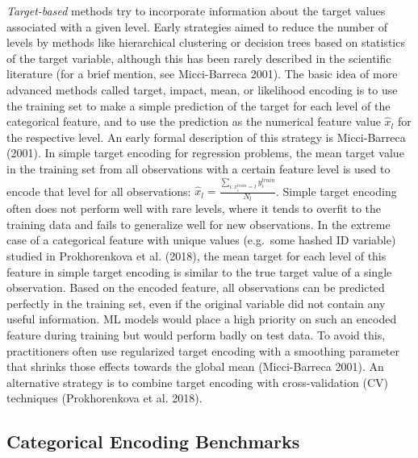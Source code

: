 \documentclass[smallextended]{svjour3}       %
\begin{document}
\emph{Target-based} methods try to incorporate information about the target values associated with a given level.
Early strategies aimed to reduce the number of levels by methods like hierarchical clustering or decision trees based on statistics of the target variable, although this has been rarely described in the scientific literature (for a brief mention, see Micci-Barreca 2001).
The basic idea of more advanced methods called target, impact, mean, or likelihood encoding is to use the training set to make a simple prediction of the target for each level of the categorical feature, and to use the prediction as the numerical feature value \(\hat{x}_l\) for the respective level.
An early formal description of this strategy is Micci-Barreca (2001).
In simple target encoding for regression problems, the mean target value in the training set from all observations with a certain feature level is used to encode that level for all observations: \(\hat{x}_l = \frac{\sum_{i:x^{train}_i = l}y^{train}_i}{N_l}\).
Simple target encoding often does not perform well with rare levels, where it tends to overfit to the training data and fails to generalize well for new observations.
In the extreme case of a categorical feature with unique values (e.g.~some hashed ID variable) studied in Prokhorenkova et al. (2018), the mean target for each level of this feature in simple target encoding is similar to the true target value of a single observation.
Based on the encoded feature, all observations can be predicted perfectly in the training set, even if the original variable did not contain any useful information.
ML models would place a high priority on such an encoded feature during training but would perform badly on test data.
To avoid this, practitioners often use regularized target encoding with a smoothing parameter that shrinks those effects towards the global mean (Micci-Barreca 2001).
An alternative strategy is to combine target encoding with cross-validation (CV) techniques (Prokhorenkova et al. 2018).

\hypertarget{categorical-encoding-benchmarks}{%
\subsection{Categorical Encoding Benchmarks}\label{categorical-encoding-benchmarks}}
\end{document}
